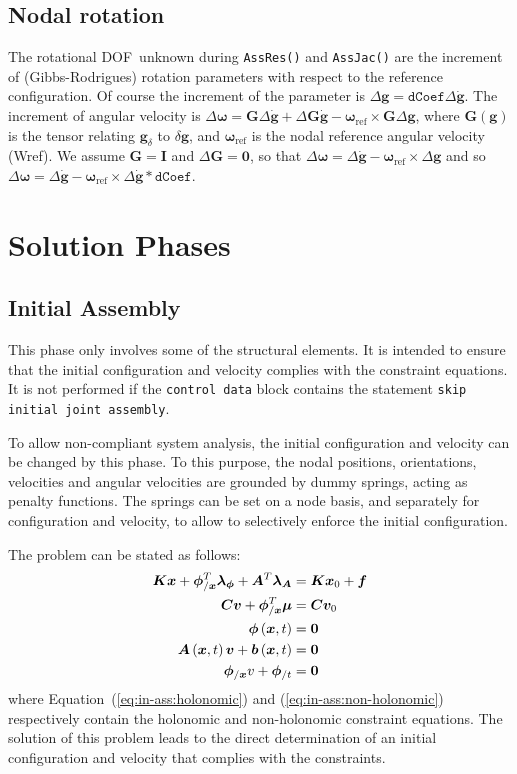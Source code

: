 \documentclass[10pt,fleqn,subeqn]{report}
\newcommand{\T}[1]{\bm{#1}}
\newcommand{\TT}[1]{\bm{#1}}
\newcommand{\dof}{DOF}
\begin{document}
\section{Nodal rotation}
The rotational \dof\ unknown during \texttt{AssRes()} and \texttt{AssJac()}
are the increment of (Gibbs-Rodrigues) rotation parameters
with respect to the reference configuration.
Of course the increment of the parameter is
$\Delta \T g=\texttt{dCoef}\Delta \dot{\T g}$.
The increment of angular velocity is 
$\Delta \T \omega = \T G\Delta \dot{\T g}+ \Delta \T G \dot{\T g}-
\T \omega_{\mathrm{ref}}\times \T G \Delta \T g$,
where $\T G(\T g)$ is the tensor relating $\T g_\delta$ to $\delta \T g$,
and $\T \omega_{\mathrm{ref}}$ is the nodal reference angular velocity (Wref).
We assume $\T G = \T I$ and $\Delta \T G = \T 0$,
so that $\Delta \T \omega = \Delta \dot{\T g}-\T \omega_{\mathrm{ref}}\times\Delta \T g$
and so $\Delta \T \omega = \Delta \dot{\T g}-
\T \omega_{\mathrm{ref}}\times\Delta \dot{\T g} * \texttt{dCoef}$.


\chapter{Solution Phases}
\section{Initial Assembly}
This phase only involves some of the structural elements.
It is intended to ensure that the initial configuration and velocity 
complies with the constraint equations.
It is not performed if the \texttt{control data} block contains 
the statement \texttt{skip initial joint assembly}.

To allow non-compliant system analysis, the initial configuration 
and velocity can be changed by this phase.
To this purpose, the nodal positions, orientations, velocities
and angular velocities are grounded by dummy springs, acting 
as penalty functions.
The springs can be set on a node basis, and separately 
for configuration and velocity, to allow to selectively enforce 
the initial configuration.

The problem can be stated as follows:
\begin{align}
	\TT{K} \T{x} + \T{\phi}_{/\T{x}}^T \T{\lambda}_{\T{\phi}} + \TT{A}^T \T{\lambda}_{\TT{A}}
		& = \TT{K} \T{x}_0 + \T{f} \\
	\TT{C} \T{v} + \T{\phi}_{/\T{x}}^T \T{\mu} & = \TT{C} \T{v}_0 \\
	\T{\phi}\plbr{\T{x}, t} & = \T{0} \label{eq:in-ass:holonomic} \\
	\TT{A}\plbr{\T{x}, t} \T{v} + \T{b}\plbr{\T{x}, t} & = \T{0} \label{eq:in-ass:non-holonomic} \\
	\T{\phi}_{/\T{x}} v + \T{\phi}_{/t} & = \T{0}
\end{align}
where Equation~(\ref{eq:in-ass:holonomic}) and (\ref{eq:in-ass:non-holonomic})
respectively contain the holonomic and non-holonomic constraint equations.
The solution of this problem leads to the direct determination
of an initial configuration and velocity that complies 
with the constraints.
\end{document}
